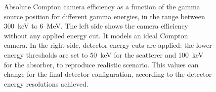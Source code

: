 \begin{figure} [!hbtp]	
\centering
{}
\caption{Absolute Compton camera efficiency as a function of the gamma source position for different gamma energies, in the range between 300~keV to 6~MeV. The left side shows the camera efficiency without any applied energy cut. It models an ideal Compton camera. In the right side, detector energy cuts are applied: the lower energy thresholds are set to 
50~keV for the scatterer and 100~keV for the absorber, to reproduce realistic scenario. This values can change for the final detector configuration, according to the detector energy resolutions achieved.}
\label{fig::efficiency_study}
\end{figure}

